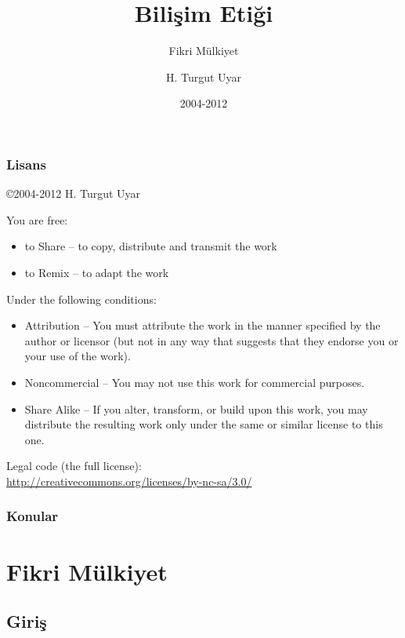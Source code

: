 \documentclass[dvipsnames]{beamer}
\title{Bilişim Etiği}
\subtitle{Fikri Mülkiyet}
\author{H. Turgut Uyar}
\date{2004-2012}
\theoremstyle{definition}
\theoremstyle{example}
\theoremstyle{plain}
\begin{document}
\begin{frame}
  \titlepage
\end{frame}

\begin{frame}
  \frametitle{Lisans}

  \hfill
  \copyright 2004-2012 H. Turgut Uyar

  \vfill
  \begin{tiny}
    You are free:
    \begin{itemize}
      \item to Share -- to copy, distribute and transmit the work
      \item to Remix -- to adapt the work
    \end{itemize}

    Under the following conditions:
    \begin{itemize}
      \item Attribution -- You must attribute the work in the manner specified by
        the author or licensor (but not in any way that suggests that they
        endorse you or your use of the work).

      \item Noncommercial -- You may not use this work for commercial purposes.

      \item Share Alike -- If you alter, transform, or build upon this work, you
        may distribute the resulting work only under the same or similar license
        to this one.
    \end{itemize}
  \end{tiny}

  \vfill
  Legal code (the full license):\\
  \url{http://creativecommons.org/licenses/by-nc-sa/3.0/}
\end{frame}

\begin{frame}
  \frametitle{Konular}
  \tableofcontents
\end{frame}

\section{Fikri Mülkiyet}

\subsection{Giriş}
\end{document}
